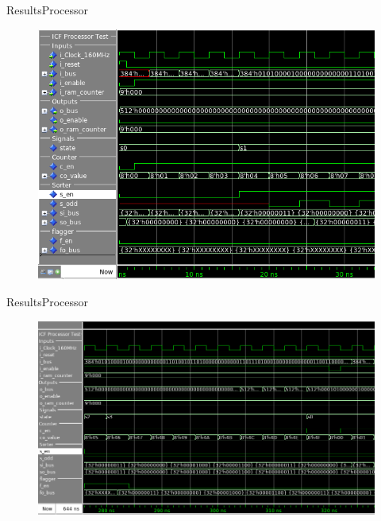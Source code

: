 \documentclass{beamer}
\begin{document}
\begin{frame}{Results}{Processor}
  \begin{figure}
    \begin{center}
      \includegraphics[height=0.6\textheight]{figs/proc-test-s01}
    \end{center}
  \end{figure}
\end{frame}

\begin{frame}{Results}{Processor}
  \begin{figure}
    \begin{center}
      \includegraphics[height=0.6\textheight]{figs/proc-test-s23}
    \end{center}
  \end{figure}
\end{frame}
\end{document}
